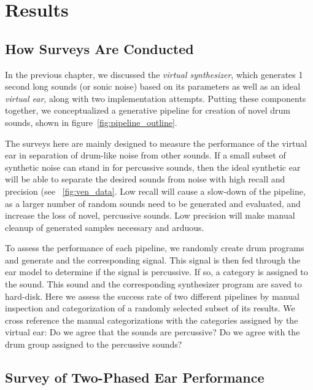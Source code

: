 \documentclass[\main/thesis.tex]{subfiles}
\begin{document}
\chapter{Results}


\label{gens}
\label{surveys}
\section{How Surveys Are Conducted}
 In the previous chapter, we discussed the \emph{virtual synthesizer}, which generates 1 second long sounds (or sonic noise) based on its parameters as well as an ideal \emph{virtual ear}, along with two implementation attempts. Putting these components together, we conceptualized a generative pipeline for creation of novel drum sounds, shown in figure~\ref{fig:pipeline_outline}.
 
The surveys here are mainly designed to measure the performance of the virtual ear in separation of drum-like noise from other sounds. If a small subset of synthetic noise can stand in for percussive sounds, then the ideal synthetic ear will be able to separate the desired sounds from noise with high recall and precision (see ~\ref{fig:ven_data}. Low recall will cause a slow-down of the pipeline, as a larger number of random sounds need to be generated and evaluated, and increase the loss of novel, percussive sounds. Low precision will make manual cleanup of generated samples necessary and arduous. 

To assess the performance of each pipeline, we randomly create drum programs and generate and the corresponding signal. This signal is then fed through the ear model to determine if the signal is percussive. If so, a category is assigned to the sound. This sound and the corresponding synthesizer program are saved to hard-disk. Here we assess the success rate of two different pipelines by manual inspection and categorization of a randomly selected subset of its results. We cross reference the manual categorizations with the categories assigned by the virtual ear: Do we agree that the sounds are percussive? Do we agree with the drum group assigned to the percussive sounds?
 
 \section{Survey of Two-Phased Ear Performance}
   
\end{document}
